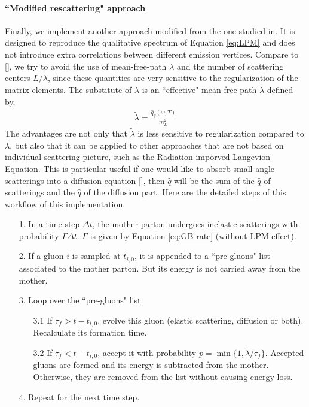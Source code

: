 \documentclass[aps, prc, reprint, amsmath, groupedaddress, nofootinbib]{revtex4-1}
\begin{document}
\paragraph*{``Modified rescattering" approach} Finally, we implement another approach modified from the one studied in.
It is designed to reproduce the qualitative spectrum of Equation \ref{eq:LPM} and does not introduce extra correlations between different emission vertices. 
Compare to [], we try to avoid the use of mean-free-path $\lambda$ and the number of scattering centers $L/\lambda$, since these quantities are very sensitive to the regularization of the matrix-elements. 
The substitute of $\lambda$ is an ``effective" mean-free-path $\tilde{\lambda}$ defined by,
\begin{eqnarray}
\tilde{\lambda} = \frac{\hat{q}_g(\omega, T)}{m_D^2}
\end{eqnarray}
The advantages are not only that $\tilde{\lambda}$ is less sensitive to regularization compared to $\lambda$, but also that it can be applied to other approaches that are not based on individual scattering picture, such as the Radiation-imporved Langevion Equation.
This is particular useful if one would like to absorb small angle scatterings into a diffusion equation [], then $\hat{q}$ will be the sum of the $\hat{q}$ of scatterings and the $\hat{q}$ of the diffusion part.
Here are the detailed steps of this workflow of this implementation,
\begin{itemize}
\item[1.] In a time step $\Delta t$, the mother parton undergoes inelastic scatterings with probability $\Gamma\Delta t$. $\Gamma$ is given by Equation \ref{eq:GB-rate} (without LPM effect).
\item[2.] If a gluon $i$ is sampled at $t_{i,0}$, it is appended to a ``pre-gluons" list associated to the mother parton. But its energy is not carried away from the mother.
\item[3.] Loop over the ``pre-gluons" list. 
\begin{itemize}
\item[3.1] If $\tau_f > t-t_{i,0}$, evolve this gluon (elastic scattering, diffusion or both). Recalculate its formation time.
\item[3.2] If $\tau_f < t-t_{i,0}$, accept it with probability $p = \min\{1, \tilde{\lambda}/\tau_f\}$. Accepted gluons are formed and its energy is subtracted from the mother. Otherwise, they are removed from the list without causing energy loss.
\end{itemize} 
\item[4.] Repeat for the next time step.
\end{itemize}
\end{document}
